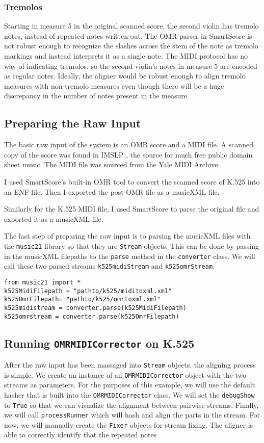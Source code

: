 \subsubsection{Tremolos}
Starting in measure 5 in the original scanned score, the second violin has tremolo notes, instead of repeated  notes written out. The OMR parser in SmartScore is not robust enough to recognize the slashes across the stem of the note as tremolo markings and instead interprets it as a single note. The MIDI protocol has no way of indicating tremolos, so the second violin's notes in measure 5 are encoded as regular  notes. Ideally, the aligner would be robust enough to align tremolo measures with non-tremolo measures even though there will be a huge discrepancy in the number of notes present in the measure.

\subsection{Preparing the Raw Input}
The basic raw input of the system is an OMR score and a MIDI file. A scanned copy of the score was found in IMSLP \cite{k525}, the source for much free public domain sheet music. The MIDI file was sourced from the Yale MIDI Archive. 

I used SmartScore's built-in OMR tool to convert the scanned score of K.525 into an ENF file. Then I exported the post-OMR file as a musicXML file.

Similarly for the K.525 MIDI file, I used SmartScore to parse the original file and exported it as a musicXML file. 

The last step of preparing the raw input is to parsing the musicXML files with the \texttt{music21} library so that they are \texttt{Stream} objects. This can be done by passing in the musicXML filepaths to the \texttt{parse} method in the \texttt{converter} class. We will call these two parsed streams \texttt{k525midiStream} and \texttt{k525omrStream}. 
\begin{verbatim}
from music21 import *
k525MidiFilepath = "pathto/k525/miditoxml.xml"
k525OmrFilepath= "pathto/k525/omrtoxml.xml"
k525midistream = converter.parse(k525MidiFilepath)
k525omrstream = converter.parse(k525OmrFilepath)
\end{verbatim}
\subsection{Running \texttt{OMRMIDICorrector} on K.525}
After the raw input has been massaged into \texttt{Stream} objects, the aligning process is simple. We create an instance of an \texttt{OMRMIDICorrector} object with the two streams as parameters. For the purposes of this example, we will use the default hasher that is built into the \texttt{OMRMIDICorrector} class. We will set the \texttt{debugShow} to \texttt{True} so that we can visualize the alignment between pairwise streams. Finally, we will call \texttt{processRunner} which will hash and align the parts in the stream. For now, we will manually create the \texttt{Fixer} objects for stream fixing. The aligner is able to correctly identify that the repeated  notes 

